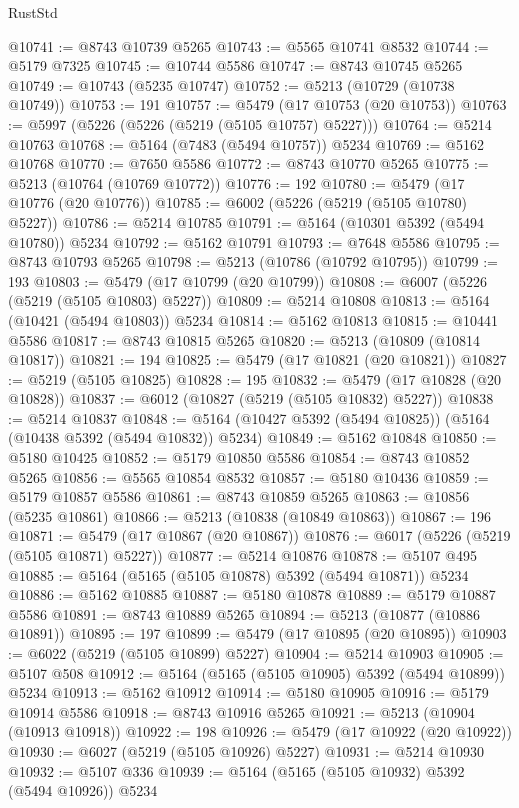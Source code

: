 \begin{lexlean}{RustStd}
\begin{coremodule}
@10741 := @8743 @10739 @5265
@10743 := @5565 @10741 @8532
@10744 := @5179 @7325
@10745 := @10744 @5586
@10747 := @8743 @10745 @5265
@10749 := @10743 (@5235 @10747)
@10752 := @5213 (@10729 (@10738 @10749))
@10753 := 191
@10757 := @5479 (@17 @10753 (@20 @10753))
@10763 := @5997 (@5226 (@5226 (@5219 (@5105 @10757) @5227)))
@10764 := @5214 @10763
@10768 := @5164 (@7483 (@5494 @10757)) @5234
@10769 := @5162 @10768
@10770 := @7650 @5586
@10772 := @8743 @10770 @5265
@10775 := @5213 (@10764 (@10769 @10772))
@10776 := 192
@10780 := @5479 (@17 @10776 (@20 @10776))
@10785 := @6002 (@5226 (@5219 (@5105 @10780) @5227))
@10786 := @5214 @10785
@10791 := @5164 (@10301 @5392 (@5494 @10780)) @5234
@10792 := @5162 @10791
@10793 := @7648 @5586
@10795 := @8743 @10793 @5265
@10798 := @5213 (@10786 (@10792 @10795))
@10799 := 193
@10803 := @5479 (@17 @10799 (@20 @10799))
@10808 := @6007 (@5226 (@5219 (@5105 @10803) @5227))
@10809 := @5214 @10808
@10813 := @5164 (@10421 (@5494 @10803)) @5234
@10814 := @5162 @10813
@10815 := @10441 @5586
@10817 := @8743 @10815 @5265
@10820 := @5213 (@10809 (@10814 @10817))
@10821 := 194
@10825 := @5479 (@17 @10821 (@20 @10821))
@10827 := @5219 (@5105 @10825)
@10828 := 195
@10832 := @5479 (@17 @10828 (@20 @10828))
@10837 := @6012 (@10827 (@5219 (@5105 @10832) @5227))
@10838 := @5214 @10837
@10848 := @5164 (@10427 @5392 (@5494 @10825)) (@5164 (@10438 @5392 (@5494 @10832)) @5234)
@10849 := @5162 @10848
@10850 := @5180 @10425
@10852 := @5179 @10850 @5586
@10854 := @8743 @10852 @5265
@10856 := @5565 @10854 @8532
@10857 := @5180 @10436
@10859 := @5179 @10857 @5586
@10861 := @8743 @10859 @5265
@10863 := @10856 (@5235 @10861)
@10866 := @5213 (@10838 (@10849 @10863))
@10867 := 196
@10871 := @5479 (@17 @10867 (@20 @10867))
@10876 := @6017 (@5226 (@5219 (@5105 @10871) @5227))
@10877 := @5214 @10876
@10878 := @5107 @495
@10885 := @5164 (@5165 (@5105 @10878) @5392 (@5494 @10871)) @5234
@10886 := @5162 @10885
@10887 := @5180 @10878
@10889 := @5179 @10887 @5586
@10891 := @8743 @10889 @5265
@10894 := @5213 (@10877 (@10886 @10891))
@10895 := 197
@10899 := @5479 (@17 @10895 (@20 @10895))
@10903 := @6022 (@5219 (@5105 @10899) @5227)
@10904 := @5214 @10903
@10905 := @5107 @508
@10912 := @5164 (@5165 (@5105 @10905) @5392 (@5494 @10899)) @5234
@10913 := @5162 @10912
@10914 := @5180 @10905
@10916 := @5179 @10914 @5586
@10918 := @8743 @10916 @5265
@10921 := @5213 (@10904 (@10913 @10918))
@10922 := 198
@10926 := @5479 (@17 @10922 (@20 @10922))
@10930 := @6027 (@5219 (@5105 @10926) @5227)
@10931 := @5214 @10930
@10932 := @5107 @336
@10939 := @5164 (@5165 (@5105 @10932) @5392 (@5494 @10926)) @5234

\end{coremodule}
\end{lexlean}
